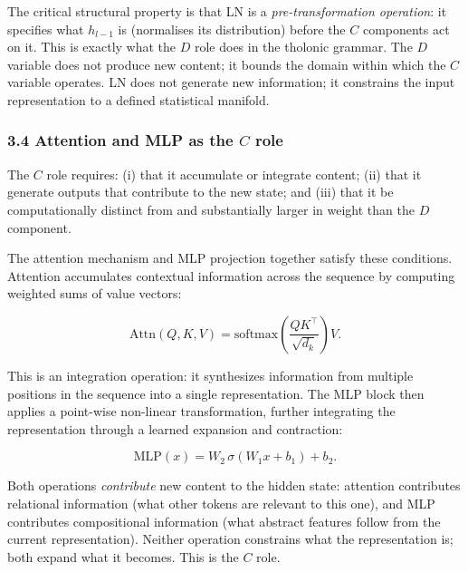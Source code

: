 \documentclass[
  11pt,
  letterpaper,
]{article}
\begin{document}
The critical structural property is that LN is a
\emph{pre-transformation operation}: it specifies what \(h_{l-1}\) is
(normalises its distribution) before the \(C\) components act on it.
This is exactly what the \(D\) role does in the tholonic grammar. The
\(D\) variable does not produce new content; it bounds the domain within
which the \(C\) variable operates. LN does not generate new information;
it constrains the input representation to a defined statistical
manifold.

\subsubsection{\texorpdfstring{3.4 Attention and MLP as the \(C\)
role}{3.4 Attention and MLP as the C role}}\label{attention-and-mlp-as-the-c-role}

The \(C\) role requires: (i) that it accumulate or integrate content;
(ii) that it generate outputs that contribute to the new state; and
(iii) that it be computationally distinct from and substantially larger
in weight than the \(D\) component.

The attention mechanism and MLP projection together satisfy these
conditions. Attention accumulates contextual information across the
sequence by computing weighted sums of value vectors:

\[\text{Attn}(Q, K, V) = \text{softmax}\!\left(\frac{QK^\top}{\sqrt{d_k}}\right) V.\]

This is an integration operation: it synthesizes information from
multiple positions in the sequence into a single representation. The MLP
block then applies a point-wise non-linear transformation, further
integrating the representation through a learned expansion and
contraction:

\[\text{MLP}(x) = W_2\,\sigma(W_1 x + b_1) + b_2.\]

Both operations \emph{contribute} new content to the hidden state:
attention contributes relational information (what other tokens are
relevant to this one), and MLP contributes compositional information
(what abstract features follow from the current representation). Neither
operation constrains what the representation is; both expand what it
becomes. This is the \(C\) role.
\end{document}
